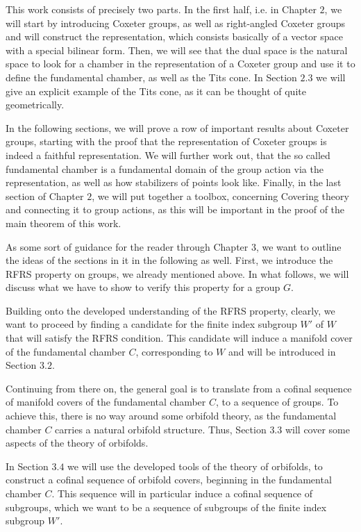 This work consists of precisely two parts.
In the first half, i.e. in Chapter \(2\), we will start by introducing Coxeter groups, as well as right-angled Coxeter groups and will construct the representation, which consists basically of a vector space with a special bilinear form.
Then, we will see that the dual space is the natural space to look for a chamber in the representation of a Coxeter group and use it to define the fundamental chamber, as well as the Tits cone.
In Section \(2.3\) we will give an explicit example of the Tits cone, as it can be thought of quite geometrically.

\noindent
In the following sections, we will prove a row of important results about Coxeter groups, starting with the proof that the representation of Coxeter groups is indeed a faithful representation.
We will further work out, that the so called fundamental chamber is a fundamental domain of the group action via the representation, as well as how stabilizers of points look like.
Finally, in the last section of Chapter \(2\), we will put together a toolbox, concerning Covering theory and connecting it to group actions, as this will be important in the proof of the main theorem of this work.

As some sort of guidance for the reader through Chapter \(3\), we want to outline the ideas of the sections in it in the following as well.
First, we introduce the RFRS property on groups, we already mentioned above. %
In what follows, we will discuss what we have to show to verify this property for a group \(G\).

\noindent
Building onto the developed understanding of the RFRS property, clearly, we want to proceed by finding a candidate for the finite index subgroup \(W'\) of \(W\) that will satisfy the RFRS condition.
This candidate will induce a manifold cover of the fundamental chamber \(C\), corresponding to \(W\) and will be introduced in Section \(3.2\).

\noindent
Continuing from there on, the general goal is to translate from a cofinal sequence of manifold covers of the fundamental chamber \(C\), to a sequence of groups.
To achieve this, there is no way around some orbifold theory, as the fundamental chamber \(C\) carries a natural orbifold structure.
Thus, Section \(3.3\) will cover some aspects of the theory of orbifolds.

\noindent
In Section \(3.4\) we will use the developed tools of the theory of orbifolds, to construct a cofinal sequence of orbifold covers, beginning in the fundamental chamber \(C\).
This sequence will in particular induce a cofinal sequence of subgroups, which we want to be a sequence of subgroups of the finite index subgroup \(W'\).

